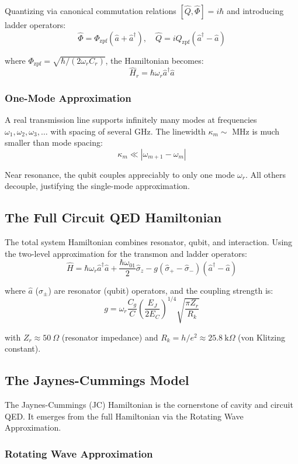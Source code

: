 \documentclass{article}
\begin{document}
Quantizing via canonical commutation relations $[\hat{Q}, \hat{\Phi}] = i\hbar$ and introducing ladder operators:
$$\hat{\Phi} = \Phi_{\text{zpf}}(\hat{a} + \hat{a}^\dagger), \quad \hat{Q} = iQ_{\text{zpf}}(\hat{a}^\dagger - \hat{a})$$

where $\Phi_{\text{zpf}} = \sqrt{\hbar/(2\omega_r C_r)}$, the Hamiltonian becomes:
$$\hat{H}_r = \hbar\omega_r \hat{a}^\dagger \hat{a}$$

\subsubsection*{One-Mode Approximation}

A real transmission line supports infinitely many modes at frequencies $\omega_1, \omega_2, \omega_3, \ldots$ with spacing of several GHz. The linewidth $\kappa_m \sim$ MHz is much smaller than mode spacing:
$$\kappa_m \ll |\omega_{m+1} - \omega_m|$$

Near resonance, the qubit couples appreciably to only one mode $\omega_r$. All others decouple, justifying the single-mode approximation.

\subsection{The Full Circuit QED Hamiltonian}

The total system Hamiltonian combines resonator, qubit, and interaction. Using the two-level approximation for the transmon and ladder operators:
$$\hat{H} = \hbar\omega_r \hat{a}^\dagger \hat{a} + \frac{\hbar\omega_{01}}{2}\hat{\sigma}_z - g(\hat{\sigma}_+ - \hat{\sigma}_-)(\hat{a}^\dagger - \hat{a})$$

where $\hat{a}$ ($\hat{\sigma}_\pm$) are resonator (qubit) operators, and the coupling strength is:
$$g = \omega_r \frac{C_g}{C}\left(\frac{E_J}{2E_C}\right)^{1/4}\sqrt{\frac{\pi Z_r}{R_k}}$$

with $Z_r \approx 50~\Omega$ (resonator impedance) and $R_k = h/e^2 \approx 25.8~\text{k}\Omega$ (von Klitzing constant).

\subsection{The Jaynes-Cummings Model}

The Jaynes-Cummings (JC) Hamiltonian is the cornerstone of cavity and circuit QED. It emerges from the full Hamiltonian via the Rotating Wave Approximation.

\subsubsection*{Rotating Wave Approximation}
\end{document}
